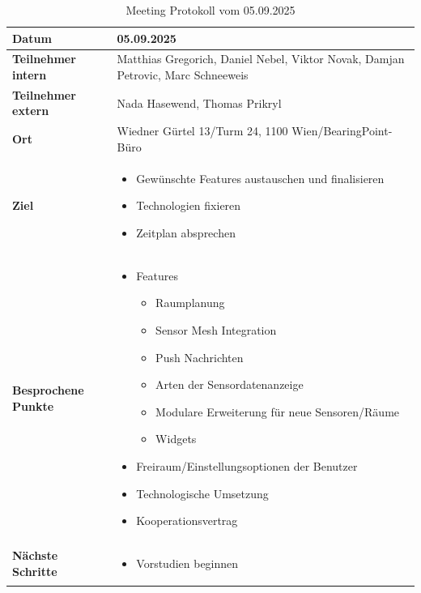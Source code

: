 \documentclass{article}
\begin{document}
\begin{table}[H]
  \centering
  \begin{tabularx}{\textwidth}{|>{\columncolor{black!10}}l|X|}
    \hline
    \textbf{Datum} & 05.09.2025 \\
    \hline
    \textbf{Teilnehmer intern} & Matthias Gregorich, Daniel Nebel, Viktor Novak, Damjan Petrovic, Marc Schneeweis \\ 
    \hline
    \textbf{Teilnehmer extern} & Nada Hasewend, Thomas Prikryl \\
    \hline
    \textbf{Ort} & Wiedner Gürtel 13/Turm 24, 1100 Wien/BearingPoint-Büro \\ 
    \hline
    \textbf{Ziel} &
    \vspace{-0.5em}
    \begin{itemize}
        \item Gewünschte Features austauschen und finalisieren
        \item Technologien fixieren
        \item Zeitplan absprechen
    \end{itemize} \\
    \hline
    \textbf{Besprochene Punkte} &
    \vspace{-0.5em}
    \begin{itemize}
        \item Features
          \begin{itemize}[label=-,leftmargin=1.2em,nosep,topsep=0pt]
            \item Raumplanung
            \item Sensor Mesh Integration
            \item Push Nachrichten
            \item Arten der Sensordatenanzeige
            \item Modulare Erweiterung für neue Sensoren/Räume
            \item Widgets
          \end{itemize}
        \item Freiraum/Einstellungsoptionen der Benutzer
        \item Technologische Umsetzung
        \item Kooperationsvertrag
    \end{itemize} \\
    \hline
    \textbf{Nächste Schritte} &
    \vspace{-0.5em}
    \begin{itemize}
        \item Vorstudien beginnen 
    \end{itemize} \\
    \hline
  \end{tabularx}
  \caption{Meeting Protokoll vom 05.09.2025}
  \label{tab:meeting-05-09-2025}
\end{table}
\end{document}
